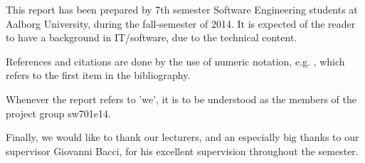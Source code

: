 This report has been prepared by 7th semester Software Engineering students at Aalborg University, during the fall-semester of 2014.
It is expected of the reader to have a background in IT/software, due to the technical content.

References and citations are done by the use of numeric notation, e.g. \cite{aalborgbycyklenbagcyklen}, which refers to the first item in the bibliography.

Whenever the report refers to 'we', it is to be understood as the members of the project group sw701e14.

Finally, we would like to thank our lecturers, and an especially big thanks to our supervisor Giovanni Bacci, for his excellent supervision throughout the semester.
